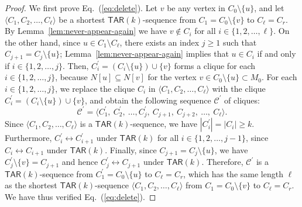 \documentclass{llncs}
\newcommand{\onestep}{\leftrightarrow}
\newcommand{\TAR}[1]{\mathsf{TAR}(#1)}
\newcommand{\ini}{0}
\newcommand{\tar}{r}
\newcommand{\cliq}{C}
\newcounter{one}
\begin{document}
\begin{proof}
	We first prove Eq.~(\ref{eq:delete}). 
	Let $v$ be any vertex in $\cliq_{\ini} \setminus \{u\}$, and let $\langle \cliq_{1}, \cliq_{2}, \ldots, \cliq_{\ell} \rangle$ be a shortest $\TAR{k}$-sequence from $\cliq_{1} = \cliq_{\ini} \setminus \{v\}$ to  $\cliq_{\ell} = \cliq_{\tar}$.
	By Lemma~\ref{lem:never-appear-again} we have $v \notin \cliq_{i}$ for all $i \in \{1,2, \ldots, \ell\}$.
	On the other hand, since $u \in \cliq_{1} \setminus \cliq_{\ell}$, there exists an index $j \ge 1$ such that $\cliq_{j+1} = \cliq_j \setminus \{ u\}$;
Lemma~\ref{lem:never-appear-again} implies that $u \in \cliq_{i}$ if and only if $i \in \{1,2,\ldots, j\}$.
	Then, $\cliq_i^\prime = (\cliq_{i} \setminus \{ u \}) \cup \{v\}$ forms a clique for each $i \in \{1,2,\ldots, j\}$, because $N[u] \subseteq N[v]$ for the vertex $v \in \cliq_{\ini} \setminus \{u\} \subset M_0$.
	For each $i \in \{1,2, \ldots, j\}$, we replace the clique $\cliq_i$ in $\langle \cliq_{1}, \cliq_{2}, \ldots, \cliq_{\ell} \rangle$ with the clique $\cliq_i^\prime = (\cliq_{i} \setminus \{ u \}) \cup \{v\}$, and obtain the following sequence $\mathcal{C}^\prime$ of cliques:
	\[
		\mathcal{C}^\prime = \langle \cliq_1^\prime,\ \cliq_2^\prime,\ \ldots, \cliq_j^\prime,\ \cliq_{j+1},\ \cliq_{j+2},\ \ldots,\  \cliq_{\ell} \rangle.  
	\]
	Since $\langle \cliq_{1}, \cliq_{2}, \ldots, \cliq_{\ell} \rangle$ is a $\TAR{k}$-sequence, we have $|\cliq_{i}^\prime| = |\cliq_{i}| \ge k$.
	Furthermore, $\cliq_{i}^\prime \onestep \cliq_{i+1}^\prime$ under $\TAR{k}$ for all $i \in \{1,2,\ldots, j-1\}$, since $\cliq_i \onestep \cliq_{i+1}$ under $\TAR{k}$.
	Finally, since $\cliq_{j+1} = \cliq_{j} \setminus \{u\}$, we have $\cliq_{j}^\prime \setminus \{v\} = \cliq_{j+1}$ and hence $\cliq_{j}^\prime \onestep \cliq_{j+1}$ under $\TAR{k}$.
	Therefore, $\mathcal{C}^\prime$ is a $\TAR{k}$-sequence from $\cliq_{1}^\prime = \cliq_{\ini} \setminus \{u\}$ to  $\cliq_{\ell} = \cliq_{\tar}$, which has the same length $\ell$ as the shortest $\TAR{k}$-sequence $\langle \cliq_{1}, \cliq_{2}, \ldots, \cliq_{\ell} \rangle$ from $\cliq_{1} = \cliq_{\ini} \setminus \{v\}$ to  $\cliq_{\ell} = \cliq_{\tar}$.
	We have thus verified Eq.~(\ref{eq:delete}). 
\medskip  


\end{proof}
\end{document}
